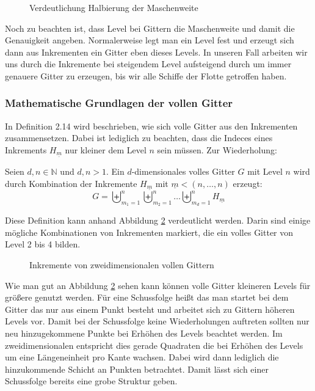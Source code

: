 \documentclass[a4paper,12pt]{llncs}
\numberwithin{equation}{section}
\begin{document}
\begin{figure}
	\centering
	\resizebox{90mm}{!}{}
	\caption{Verdeutlichung Halbierung der Maschenweite}
	\label{fig:gitter01}
\end{figure}


Noch zu beachten ist, dass Level bei Gittern die Maschenweite und damit die Genauigkeit angeben. Normalerweise legt man ein Level fest und erzeugt sich dann aus Inkrementen ein Gitter eben dieses Levels. In unseren Fall arbeiten wir uns durch die Inkremente bei steigendem Level aufsteigend durch um immer genauere Gitter zu erzeugen, bis wir alle Schiffe der Flotte getroffen haben.

\subsubsection{Mathematische Grundlagen der vollen Gitter}

In \cite{M13} Definition 2.14 wird beschrieben, wie sich volle Gitter aus den Inkrementen zusammensetzen. Dabei ist lediglich zu beachten, dass die Indeces eines Inkrements $H_{\underline{m}}$ nur kleiner dem Level $n$ sein müssen.  Zur Wiederholung:

\begin{definition}
	Seien $d,n\in\mathbb{N}$ und $d,n>1$. Ein $d$-dimensionales volles Gitter $G$ mit Level $n$ wird durch Kombination der Inkremente $H_{\underline{m}}$ mit $\underline{m}<(n,\dots,n)$ erzeugt:
	\begin{equation}
		G=\biguplus_{m_1=1}^n\biguplus_{m_2=1}^n\dots \biguplus_{m_d=1}^n H_{\underline{m}}
	\end{equation}
\end{definition}

Diese Definition kann anhand Abbildung \ref{fig:gitter02} verdeutlicht werden. Darin sind einige mögliche Kombinationen von Inkrementen markiert, die ein volles Gitter von Level 2 bis 4 bilden.

\begin{figure}
	\caption{Inkremente von zweidimensionalen vollen Gittern}
	\label{fig:gitter02}
\end{figure}

Wie man gut an Abbildung \ref{fig:gitter02} sehen kann können volle Gitter kleineren Levels für größere genutzt werden. Für eine Schussfolge heißt das man startet bei dem Gitter das nur aus einem Punkt besteht und arbeitet sich zu Gittern höheren Levels vor. Damit bei der Schussfolge keine Wiederholungen auftreten sollten nur neu hinzugekommene Punkte bei Erhöhen des Levels beachtet werden. Im zweidimensionalen entspricht dies gerade Quadraten die bei Erhöhen des Levels um eine Längeneinheit pro Kante wachsen. Dabei wird dann lediglich die hinzukommende Schicht an Punkten betrachtet. Damit lässt sich einer Schussfolge bereits eine grobe Struktur geben. 
\end{document}
